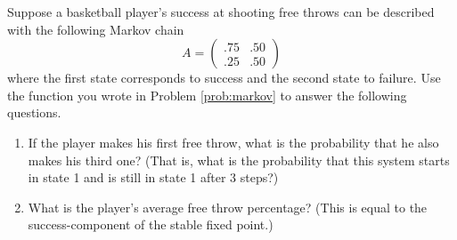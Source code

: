 \begin{problem}
Suppose a basketball player's success at shooting free throws can be described with the following Markov chain
\[
A = \begin{pmatrix}.75&.50\\.25&.50\end{pmatrix}
\]
where the first state corresponds to success and the second state to failure. Use the function you wrote in Problem \ref{prob:markov} to answer the following questions.
\begin{enumerate}
\item If the player makes his first free throw, what is the probability that he also makes his third one? 
(That is, what is the probability that this system starts in state 1 and is still in state 1 after 3 steps?)
\item What is the player's average free throw percentage? 
(This is equal to the success-component of the stable fixed point.)
\end{enumerate}
\label{prob:markov_freethrow}
\end{problem}

\begin{comment}
\begin{problem}
Consider the Markov process given by the transition diagram in Figure \ref{fig:markov2}.
\begin{figure}[H]
\texttt{[image: markov2]}
\caption{Transition diagram}
\label{fig:markov2}
\end{figure}

\begin{enumerate}
\item Find the transition matrix.
\item If the Markov process is in state 1 initially, find the probability that it is in state 2 after two transitions.
\item Find the stable fixed point if it exists.
\end{enumerate}
\label{prob:markov_stablept}
\end{problem}
\end{comment}